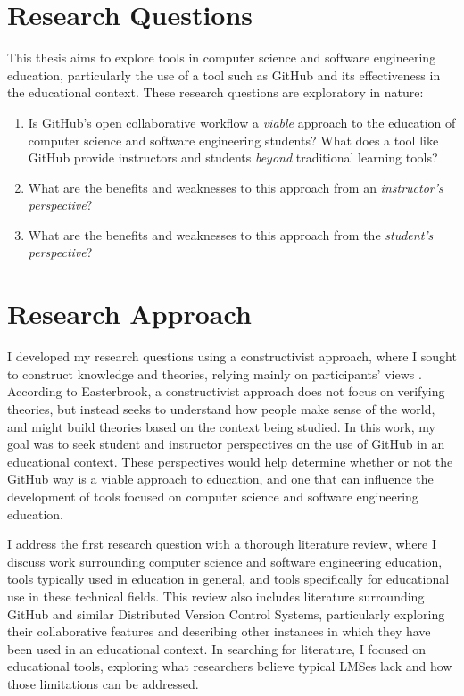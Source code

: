 
\section{Research Questions}
This thesis aims to explore tools in computer science and software engineering education, particularly the use of a tool such as GitHub and its effectiveness in the educational context. These research questions are exploratory in nature: \\
\begin{enumerate}
\item Is GitHub's open collaborative workflow a \emph{viable} approach to the education of computer science and software engineering students? What does a tool like GitHub provide instructors and students \emph{beyond} traditional learning tools?
\item What are the benefits and weaknesses to this approach from an \emph{instructor's perspective}?
\item What are the benefits and weaknesses to this approach from the \emph{student's perspective}?
\end{enumerate}

\section{Research Approach}
I developed my research questions using a constructivist approach, where I sought to construct knowledge and theories, relying mainly on participants' views \cite{easterbrook2008selecting}. According to Easterbrook, a constructivist approach does not focus on verifying theories, but instead seeks to understand how people make sense of the world, and might build theories based on the context being studied. In this work, my goal was to seek student and instructor perspectives on the use of GitHub in an educational context. These perspectives would help determine whether or not the GitHub way is a viable approach to education, and one that can influence the development of tools focused on computer science and software engineering education.


I address the first research question with a thorough literature review, where I discuss work surrounding computer science and software engineering education, tools typically used in education in general, and tools specifically for educational use in these technical fields. This review also includes literature surrounding GitHub and similar Distributed Version Control Systems, particularly exploring their collaborative features and describing other instances in which they have been used in an educational context. In searching for literature, I focused on educational tools, exploring what researchers believe typical LMSes lack and how those limitations can be addressed.

